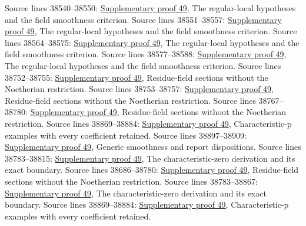 \begin{AlgebraSourceRoutes}
 Source lines 38540--38550: \hyperlink{algebra_smooth_fields_notes_20260928}{Supplementary proof 49}, The regular-local hypotheses and the field smoothness criterion.
 Source lines 38551--38557: \hyperlink{algebra_smooth_fields_notes_20260928}{Supplementary proof 49}, The regular-local hypotheses and the field smoothness criterion.
 Source lines 38564--38575: \hyperlink{algebra_smooth_fields_notes_20260928}{Supplementary proof 49}, The regular-local hypotheses and the field smoothness criterion.
 Source lines 38577--38588: \hyperlink{algebra_smooth_fields_notes_20260928}{Supplementary proof 49}, The regular-local hypotheses and the field smoothness criterion.
 Source lines 38752--38755: \hyperlink{algebra_smooth_fields_notes_20260928}{Supplementary proof 49}, Residue-field sections without the Noetherian restriction.
 Source lines 38753--38757: \hyperlink{algebra_smooth_fields_notes_20260928}{Supplementary proof 49}, Residue-field sections without the Noetherian restriction.
 Source lines 38767--38780: \hyperlink{algebra_smooth_fields_notes_20260928}{Supplementary proof 49}, Residue-field sections without the Noetherian restriction.
 Source lines 38869--38884: \hyperlink{algebra_smooth_fields_notes_20260928}{Supplementary proof 49}, Characteristic-p examples with every coefficient retained.
 Source lines 38897--38909: \hyperlink{algebra_smooth_fields_notes_20260928}{Supplementary proof 49}, Generic smoothness and report dispositions.
 Source lines 38783--38815: \hyperlink{algebra_smooth_fields_notes_20260928}{Supplementary proof 49}, The characteristic-zero derivation and its exact boundary.
 Source lines 38686--38780: \hyperlink{algebra_smooth_fields_notes_20260928}{Supplementary proof 49}, Residue-field sections without the Noetherian restriction.
 Source lines 38783--38867: \hyperlink{algebra_smooth_fields_notes_20260928}{Supplementary proof 49}, The characteristic-zero derivation and its exact boundary.
 Source lines 38869--38884: \hyperlink{algebra_smooth_fields_notes_20260928}{Supplementary proof 49}, Characteristic-p examples with every coefficient retained.
\end{AlgebraSourceRoutes}


